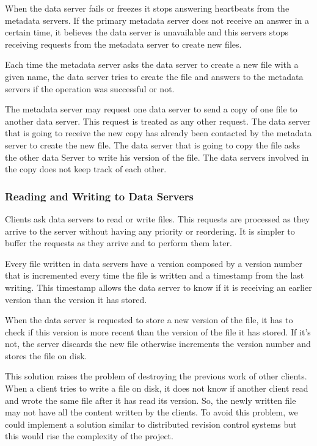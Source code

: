 When the data server fails or freezes it stops answering heartbeats from
the metadata servers. If the primary metadata server does not receive an
answer in a certain time, it believes the data server is unavailable
and this servers stops receiving requests from the metadata server to
create new files.

Each time the metadata server asks the data server to create a new file
with a given name, the data server tries to create the file and answers
to the metadata servers if the operation was successful or not.

The metadata server may request one data server to send a copy of one file
to another data server. This request is treated as any other request.
The data server that is going to receive the new copy has already been
contacted by the metadata server to create the new file. The data server
that is going to copy the file asks the other data Server to write his
version of the file. The data servers involved in the copy does not keep 
track of each other.

\subsubsection{Reading and Writing to Data Servers}

Clients ask data servers to read or write files. This requests are
processed as they arrive to the server without having any priority or 
reordering. It is simpler to buffer the requests as they arrive and to
perform them later.

Every file written in data servers have a version composed by a version
number that is incremented every time the file is written and a timestamp
from the last writing. This timestamp allows the data server to know if it is
receiving an earlier version than the version it has stored.

When the data server is requested to store a new version of the file, it has 
to check if this version is more recent than the version of the file it has 
stored. If it's not, the server discards the new file otherwise increments 
the version number and stores the file on disk.

This solution raises the problem of destroying the previous work of other 
clients. When a client tries to write a file on disk, it does not know if 
another client read and wrote the same file after it has read its version. 
So, the newly written file may not have all the content written by the 
clients. To avoid this problem, we could implement a solution similar to 
distributed revision control systems but this would rise the complexity 
of the project.
